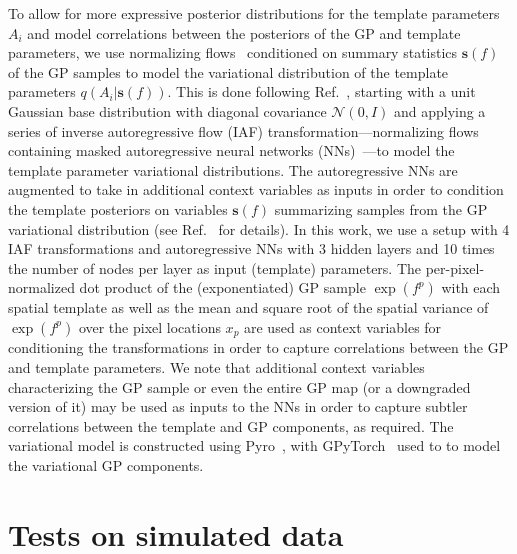 \documentclass[]{article}
\begin{document}
To allow for more expressive posterior distributions for the template parameters $A_i$ and model correlations between the posteriors of the GP and template parameters, we use normalizing flows~\cite{pmlr-v37-rezende15} conditioned on summary statistics $\mathbf{s}(f)$ of the GP samples to model the variational distribution of the template parameters $q(A_i|\mathbf{s}(f))$.
This is done following Ref.~\cite{quinonero-candela_unifying_2005}, starting with a unit Gaussian base distribution with diagonal covariance $\mathcal{N}(0, I)$ and applying a series of inverse autoregressive flow (IAF) transformation---normalizing flows containing masked autoregressive neural networks (NNs)~\cite{germain2015made}---to model the template parameter variational distributions. The autoregressive NNs are augmented to take in additional context variables as inputs in order to condition the template posteriors on variables $\mathbf{s}(f)$ summarizing samples from the GP variational distribution (see Ref.~\cite{10.5555/3045390.3045710} for details). In this work, we use a setup with 4 IAF transformations and autoregressive NNs with 3 hidden layers and 10 times the number of nodes per layer as input (template) parameters. The per-pixel-normalized dot product of the (exponentiated) GP sample $\exp\left(f^p\right)$ with each spatial template as well as the mean and square root of the spatial variance of $\exp\left(f^p\right)$ over the pixel locations $x_p$ are used as context variables for conditioning the transformations in order to capture correlations between the GP and template parameters. We note that additional context variables characterizing the GP sample or even the entire GP map (or a downgraded version of it) may be used as inputs to the NNs in order to capture subtler correlations between the template and GP components, as required. The variational model is constructed using Pyro~\cite{bingham2019pyro}, with GPyTorch~\cite{gardner2018gpytorch} used to to model the variational GP components. 

\section{Tests on simulated data}
\label{sec:experiments}
\end{document}
